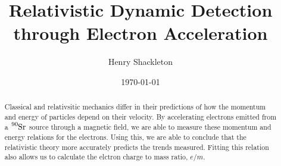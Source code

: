 \usepackage{graphicx}      %
\usepackage{lipsum}
\usepackage{float}
\usepackage{bm}            %
\usepackage{physics}
\usepackage{tensor}
\usepackage[colorlinks=true]{hyperref}  %




\title{Relativistic Dynamic Detection through Electron Acceleration}
\author{Henry Shackleton}
\date{\today}


\begin{abstract}
  Classical and relativsitic mechanics differ in their predictions of how the momentum and energy of particles depend on their velocity. By accelerating electrons emitted from a $\tensor*[^{90}]{\text{Sr}}{}$ source through a magnetic field, we are able to measure these momentum and energy relations for the electrons. Using this, we are able to conclude that the relativistic theory more accurately predicts the trends measured. Fitting this relation also allows us to calculate the elctron charge to mass ratio, $e/m$.
\end{abstract}

\maketitle
